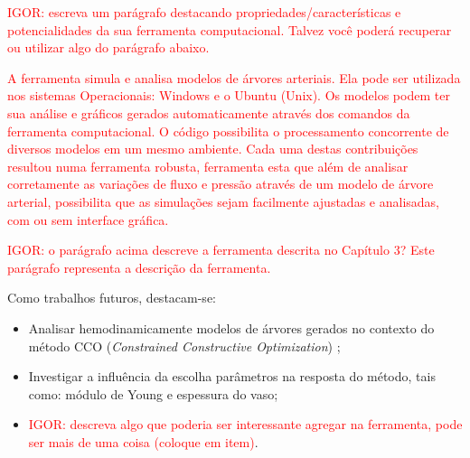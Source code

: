 \documentclass[a4paper,12pt]{monografia}
\theoremstyle{plain}
\theoremstyle{definition}
\theoremstyle{remark}
\begin{document}
\textcolor{red}{IGOR: escreva um parágrafo destacando propriedades/características e potencialidades da sua ferramenta computacional. Talvez você poderá recuperar ou utilizar algo do parágrafo abaixo.}

\textcolor{red}{A ferramenta simula e analisa modelos de árvores arteriais. Ela pode ser utilizada nos sistemas Operacionais: Windows e o Ubuntu (Unix). Os modelos podem ter sua análise e gráficos gerados automaticamente através dos comandos da ferramenta computacional. O código possibilita o processamento concorrente de diversos modelos em um mesmo ambiente. Cada uma destas contribuições resultou numa ferramenta robusta,  ferramenta esta que além de analisar corretamente as variações de fluxo e pressão através de um modelo de árvore arterial, possibilita que as simulações sejam facilmente ajustadas e analisadas, com ou sem interface gráfica.}

\textcolor{red}{IGOR: o parágrafo acima descreve a ferramenta descrita no Capítulo 3? Este parágrafo representa a descrição da ferramenta.}

Como trabalhos futuros, destacam-se:
\begin{itemize}
	\item Analisar hemodinamicamente modelos de árvores gerados no contexto do método CCO (\emph{Constrained Constructive Optimization}) \cite{Karch1999,Queiroz2013,Queiroz2015,Brito2017};
	\item Investigar a influência da escolha parâmetros na resposta do método, tais como: módulo de Young e espessura do vaso;
	\item \textcolor{red} {IGOR: descreva algo que poderia ser interessante agregar na ferramenta, pode ser mais de uma coisa (coloque em item)}.
\end{itemize}
\end{document}
